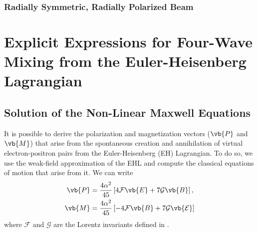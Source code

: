 \documentclass[11pt,SymmetricalJury]{inrsthesis/inrsthesis}
\begin{document}

\subsection{Radially Symmetric, Radially Polarized Beam}


\chapter{Explicit Expressions for Four-Wave Mixing from the Euler-Heisenberg Lagrangian}


\section{Solution of the Non-Linear Maxwell Equations}
It is possible to derive the polarization and magnetization vectors ($\vb{P}$ and $\vb{M}$)
that arise from the spontaneous creation and annihilation of virtual electron-positron
pairs from the Euler-Heisenberg (EH) Lagrangian. To do so, we use the weak-field
approximation of the EHL and compute the classical equations of motion that arise
from it. We can write
  \begin{subequations}
  \begin{align}
    \vb{P} &= \frac{4\alpha^2}{45}\left[ 4\mathcal{F}\vb{E}+7\mathcal{G}\vb{B}\right], \label{eq:app.fwm.polarization}\\
    \vb{M} &= \frac{4\alpha^2}{45}\left[-4\mathcal{F}\vb{B}+7\mathcal{G{\vb{E}}}\right]
  \end{align}
  \end{subequations}
where $\mathcal{F}$ and $\mathcal{G}$ are the Lorentz invariants defined in \label{somewhere}.
\end{document}
